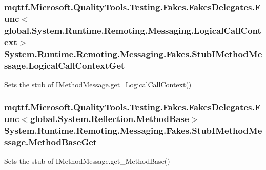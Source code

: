 \hypertarget{class_system_1_1_runtime_1_1_remoting_1_1_messaging_1_1_fakes_1_1_stub_i_method_message_a2084178800afbda502f363104bc7cd11}{
\subsubsection[{Logical\-Call\-Context\-Get}]{\setlength{\rightskip}{0pt plus 5cm}mqttf.\-Microsoft.\-Quality\-Tools.\-Testing.\-Fakes.\-Fakes\-Delegates.\-Func$<$global.\-System.\-Runtime.\-Remoting.\-Messaging.\-Logical\-Call\-Context$>$ System.\-Runtime.\-Remoting.\-Messaging.\-Fakes.\-Stub\-I\-Method\-Message.\-Logical\-Call\-Context\-Get}}\label{class_system_1_1_runtime_1_1_remoting_1_1_messaging_1_1_fakes_1_1_stub_i_method_message_a2084178800afbda502f363104bc7cd11}


Sets the stub of I\-Method\-Message.\-get\-\_\-\-Logical\-Call\-Context()

\hypertarget{class_system_1_1_runtime_1_1_remoting_1_1_messaging_1_1_fakes_1_1_stub_i_method_message_abe6fccbb738a2d4cf0c75c4fac70b42a}{
\subsubsection[{Method\-Base\-Get}]{\setlength{\rightskip}{0pt plus 5cm}mqttf.\-Microsoft.\-Quality\-Tools.\-Testing.\-Fakes.\-Fakes\-Delegates.\-Func$<$global.\-System.\-Reflection.\-Method\-Base$>$ System.\-Runtime.\-Remoting.\-Messaging.\-Fakes.\-Stub\-I\-Method\-Message.\-Method\-Base\-Get}}\label{class_system_1_1_runtime_1_1_remoting_1_1_messaging_1_1_fakes_1_1_stub_i_method_message_abe6fccbb738a2d4cf0c75c4fac70b42a}


Sets the stub of I\-Method\-Message.\-get\-\_\-\-Method\-Base()

